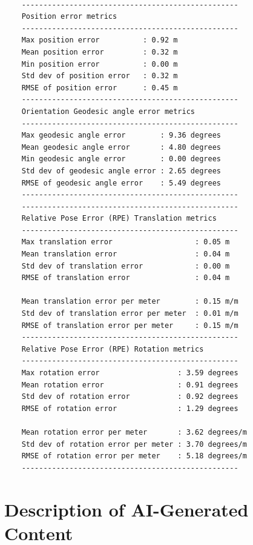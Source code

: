 \documentclass[report.tex]{subfiles}
\begin{document}
    \begin{lstlisting}[style=consoleoutput, caption={Sample summary of the statistical error metrics.}, label={lst:statistical-error-metrics}]
    
    --------------------------------------------------
    Position error metrics
    --------------------------------------------------
    Max position error          : 0.92 m
    Mean position error         : 0.32 m
    Min position error          : 0.00 m
    Std dev of position error   : 0.32 m
    RMSE of position error      : 0.45 m    
    --------------------------------------------------
    Orientation Geodesic angle error metrics
    --------------------------------------------------
    Max geodesic angle error        : 9.36 degrees
    Mean geodesic angle error       : 4.80 degrees
    Min geodesic angle error        : 0.00 degrees
    Std dev of geodesic angle error : 2.65 degrees
    RMSE of geodesic angle error    : 5.49 degrees
    --------------------------------------------------
    --------------------------------------------------
    Relative Pose Error (RPE) Translation metrics
    --------------------------------------------------
    Max translation error                   : 0.05 m
    Mean translation error                  : 0.04 m
    Std dev of translation error            : 0.00 m
    RMSE of translation error               : 0.04 m

    Mean translation error per meter        : 0.15 m/m
    Std dev of translation error per meter  : 0.01 m/m
    RMSE of translation error per meter     : 0.15 m/m
    --------------------------------------------------
    Relative Pose Error (RPE) Rotation metrics
    --------------------------------------------------
    Max rotation error                  : 3.59 degrees
    Mean rotation error                 : 0.91 degrees
    Std dev of rotation error           : 0.92 degrees
    RMSE of rotation error              : 1.29 degrees

    Mean rotation error per meter       : 3.62 degrees/m
    Std dev of rotation error per meter : 3.70 degrees/m
    RMSE of rotation error per meter    : 5.18 degrees/m
    --------------------------------------------------
    \end{lstlisting}
      
\chapter{Description of AI-Generated Content}
\label{app:aiGeneratedContent}
\end{document}
